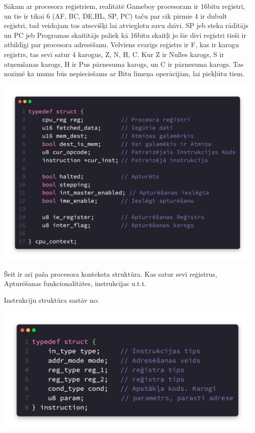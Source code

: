 \documentclass[12pt]{article}
\begin{document}
	Sākam ar procesora reģistriem, realitātē Gameboy procesoram ir 16bitu reģistri, un tie ir tikai 6 (AF, BC, DE,HL, SP, PC) taču par cik pirmie 4 ir dubult reģistri, tad veidojam tos atsevišķi lai atvieglotu savu dzīvi. SP jeb steka rādītājs un PC jeb Programas skaitītājs paliek kā 16bitu skaitļi jo šie divi reģistri tieši ir atbildīgi par procesora adresēšanu. Velviens svarīgs reģistrs ir F, kas ir karogu reģistrs, tas sevī satur 4 karogus, Z, N, H, C. Kur Z ir Nulles karogs, S ir atņemšanas karogs, H ir Pus pārnesuma karogs, un C ir pārnesuma karogs. Tas nozīmē ka mums būs nepieciešams ar Bitu līmeņa operācījām, lai piekļūtu tiem.
	\pagebreak
	
	\includegraphics[scale=0.45]{img/cpu_ctx.png}
	
	Šeit ir arī paša procesora konteksta struktūra. Kas satur sevī reģistrus, Apturēšanas funkcionalitātes, instrukcījas u.t.t.
	
	Instrukcīju struktūra sastāv no:
	
	\includegraphics[scale=0.5]{img/instr.png}
	
\end{document}
